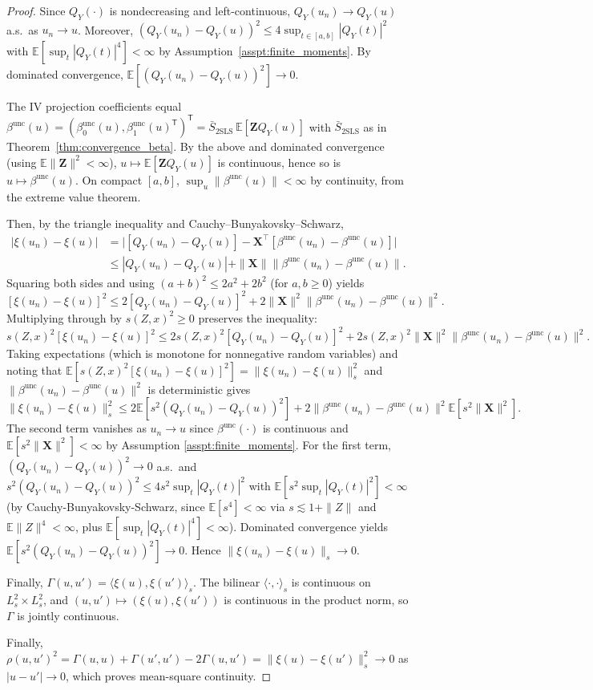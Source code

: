 \documentclass[12pt]{article}
\newcommand{\E}{\mathbb{E}}
\newcommand{\T}{\mathsf{T}} %
\begin{document}
\begin{proof}
Since $Q_Y(\cdot)$ is nondecreasing and left-continuous, $Q_Y(u_n)\to Q_Y(u)$ a.s.\ as $u_n\to u$. Moreover, $(Q_Y(u_n)-Q_Y(u))^2\le 4\sup_{t\in[a,b]}|Q_Y(t)|^2$ with $\E[\sup_t|Q_Y(t)|^4]<\infty$ by Assumption~\ref{asspt:finite_moments}. By dominated convergence, $\E[(Q_Y(u_n)-Q_Y(u))^2]\to0$.

The IV projection coefficients equal $\beta^{\text{unc}}(u) = (\beta_0^{\text{unc}}(u),\beta_1^{\text{unc}}(u)^{\!\T})^{\!\T}=\bar{S}_{\mathrm{2SLS}}\,\E[\mathbf{Z}Q_Y(u)]$ with $\bar{S}_{\mathrm{2SLS}}$ as in Theorem~\ref{thm:convergence_beta}. By the above and dominated convergence (using $\E\|\mathbf{Z}\|^2<\infty$), $u\mapsto\E[\mathbf{Z}Q_Y(u)]$ is continuous, hence so is $u\mapsto\beta^{\text{unc}}(u)$. On compact $[a,b]$, $\sup_u\|\beta^{\text{unc}}(u)\|<\infty$ by continuity, from the extreme value theorem.

Then, by the triangle inequality and Cauchy--Bunyakovsky--Schwarz,
\begin{align*}
|\xi(u_n)-\xi(u)| & = \big| [Q_Y(u_n) - Q_Y(u)] - \mathbf{X}^\top [\beta^{\text{unc}}(u_n) - \beta^{\text{unc}}(u)] \big| \\
& \leq |Q_Y(u_n) - Q_Y(u)| + \|\mathbf{X}\| \|\beta^{\text{unc}}(u_n) - \beta^{\text{unc}}(u)\|.
\end{align*}
Squaring both sides and using $(a + b)^2 \leq 2a^2 + 2b^2$ (for $a, b \geq 0$) yields
\[
[\xi(u_n) - \xi(u)]^2 \leq 2 [Q_Y(u_n) - Q_Y(u)]^2 + 2 \|\mathbf{X}\|^2 \|\beta^{\text{unc}}(u_n) - \beta^{\text{unc}}(u)\|^2.
\]
Multiplying through by $s(Z,x)^2 \geq 0$ preserves the inequality:
\[
s(Z,x)^2 [\xi(u_n) - \xi(u)]^2 \leq 2 s(Z,x)^2 [Q_Y(u_n) - Q_Y(u)]^2 + 2 s(Z,x)^2 \|\mathbf{X}\|^2 \|\beta^{\text{unc}}(u_n) - \beta^{\text{unc}}(u)\|^2.
\]
Taking expectations (which is monotone for nonnegative random variables) and noting that $\E[s(Z,x)^2 [\xi(u_n) - \xi(u)]^2] = \|\xi(u_n) - \xi(u)\|_s^2$ and $\|\beta^{\text{unc}}(u_n) - \beta^{\text{unc}}(u)\|^2$ is deterministic gives
\[
\|\xi(u_n)-\xi(u)\|_{s}^2\le2\E[s^2(Q_Y(u_n)-Q_Y(u))^2]+2\|\beta^{\text{unc}}(u_n)-\beta^{\text{unc}}(u)\|^2\E[s^2\|\mathbf{X}\|^2].
\]
The second term vanishes as $u_n\to u$ since $\beta^{\text{unc}}(\cdot)$ is continuous and $\E[s^2\|\mathbf{X}\|^2]<\infty$ by Assumption \ref{asspt:finite_moments}. For the first term, $(Q_Y(u_n)-Q_Y(u))^2\to0$ a.s.\ and $s^2(Q_Y(u_n)-Q_Y(u))^2\le4s^2\sup_t|Q_Y(t)|^2$ with $\E[s^2\sup_t|Q_Y(t)|^2]<\infty$ (by Cauchy-Bunyakovsky-Schwarz, since $\E[s^4]<\infty$ via $s\lesssim1+\|Z\|$ and $\E\|Z\|^4<\infty$, plus $\E[\sup_t|Q_Y(t)|^4]<\infty$). Dominated convergence yields $\E[s^2(Q_Y(u_n)-Q_Y(u))^2]\to0$. Hence $\|\xi(u_n)-\xi(u)\|_s\to0$.

Finally, $\Gamma(u,u')=\langle\xi(u),\xi(u')\rangle_s$. The bilinear $\langle\cdot,\cdot\rangle_s$ is continuous on $L^2_s\times L^2_s$, and $(u,u')\mapsto(\xi(u),\xi(u'))$ is continuous in the product norm, so $\Gamma$ is jointly continuous.

Finally, $\rho(u,u')^2=\Gamma(u,u)+\Gamma(u',u')-2\Gamma(u,u')=\|\xi(u)-\xi(u')\|_s^2\to0$ as $|u-u'|\to0$, which proves mean-square continuity.
\end{proof}
\end{document}
